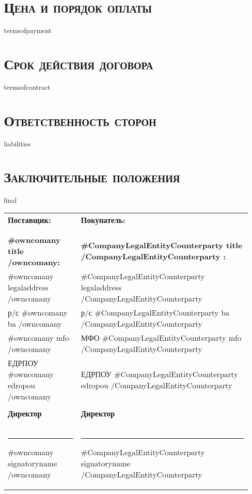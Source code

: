 {{{{{{\section{\large \textbf{\textsc{Цена и порядок оплаты}}}
{{termsofpayment}}

\section{\large \textbf{\textsc{Срок действия договора}}}
{{termsofcontract}}

\section{\large \textbf{\textsc{Ответственность сторон}}}
{{liabilities}}

\section{\large \textbf{\textsc{Заключительные положения}}}
{{final}}

\begin{tabularx}{\textwidth}{ X@{\hskip 0.5in} X }

\textbf{Поставщик:}  & \textbf{Покупатель:} \\
 & \\
 & \\
 \textbf{ {{#owncomany}} {{title}}  {{/owncomany}}:} & \textbf{ {{#CompanyLegalEntityCounterparty}} {{title}} {{/CompanyLegalEntityCounterparty}} :} \\
 {{#owncomany}} {{legaladdress}}  {{/owncomany}} &  {{#CompanyLegalEntityCounterparty}}  {{legaladdress}}  {{/CompanyLegalEntityCounterparty}}  \\
 р/с   {{#owncomany}} {{ba}}  {{/owncomany}} &  р/с  {{#CompanyLegalEntityCounterparty}}  {{ba}}  {{/CompanyLegalEntityCounterparty}}  \\
 {{#owncomany}} {{mfo}}  {{/owncomany}} &  МФО {{#CompanyLegalEntityCounterparty}}  {{mfo}}   {{/CompanyLegalEntityCounterparty}}   \\
 ЕДРПОУ {{#owncomany}} {{edropou}}  {{/owncomany}} & ЕДРПОУ {{#CompanyLegalEntityCounterparty}} {{edropou}}  {{/CompanyLegalEntityCounterparty}}  \\
 & \\
 \textbf{Директор}  & \textbf{Директор} \\
 & \\
 & \\
 & \\
 \noindent\rule{4cm}{0.5pt} {{#owncomany}} {{signatoryname}}  {{/owncomany}}   & \noindent\rule{5cm}{0.5pt} {{#CompanyLegalEntityCounterparty}} {{signatoryname}}  {{/CompanyLegalEntityCounterparty}}  \\
 \end{tabularx}



}}}}}}
